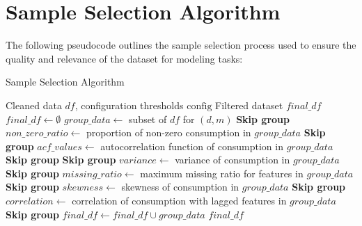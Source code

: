 \documentclass[journal]{IEEEtran}
\begin{document}
\appendix
\section{Sample Selection Algorithm}
\label{appendix:sample-selection}

The following pseudocode outlines the sample selection process used to ensure the quality and relevance of the dataset for modeling tasks:

\begin{algorithm}[H]
\caption{Sample Selection Algorithm}
\begin{algorithmic}[1]
\Require Cleaned data $df$, configuration thresholds $\text{config}$
\Ensure Filtered dataset $final\_df$
\State $final\_df \gets \emptyset$
    \State $group\_data \gets$ subset of $df$ for $(d, m)$
        \State \textbf{Skip group} 
    \EndIf
    \State $non\_zero\_ratio \gets$ proportion of non-zero consumption in $group\_data$
        \State \textbf{Skip group} 
    \EndIf
    \State $acf\_values \gets$ autocorrelation function of consumption in $group\_data$
        \State \textbf{Skip group} 
    \EndIf
        \State \textbf{Skip group} 
    \EndIf
    \State $variance \gets$ variance of consumption in $group\_data$
        \State \textbf{Skip group} 
    \EndIf
    \State $missing\_ratio \gets$ maximum missing ratio for features in $group\_data$
        \State \textbf{Skip group} 
    \EndIf
    \State $skewness \gets$ skewness of consumption in $group\_data$
        \State \textbf{Skip group} 
    \EndIf
    \State $correlation \gets$ correlation of consumption with lagged features in $group\_data$
        \State \textbf{Skip group} 
    \EndIf
    \State $final\_df \gets final\_df \cup group\_data$
\EndFor
\State \Return $final\_df$
\end{algorithmic}
\end{algorithm}




\end{document}
